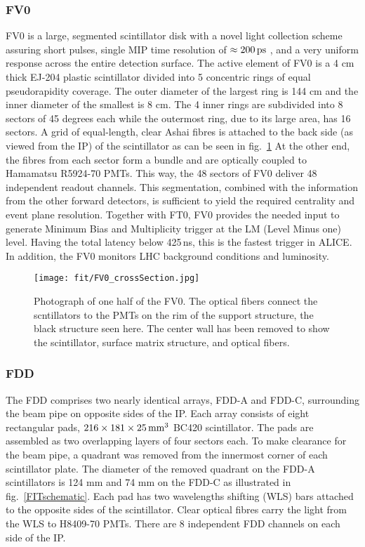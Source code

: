 \subsubsection{FV0}
FV0 is a large, segmented scintillator disk with a novel light collection scheme \cite{grabski2019new} assuring short pulses, single MIP time resolution of $\approx 200\, \rm{ps}$  , and a very uniform response across the entire detection surface. The active element of FV0 is a 4 cm thick EJ-204 plastic scintillator divided into 5 concentric rings of equal pseudorapidity coverage. The outer diameter of the largest ring is 144 cm and the inner diameter of the smallest is 8 cm. The 4 inner rings are subdivided into 8 sectors of 45 degrees each while the outermost ring, due to its large area, has 16 sectors. A grid of equal-length, clear Ashai fibres is attached to the back side (as viewed from the IP) of the scintillator as can be seen in fig.~\ref{FV0fig} At the other end, the fibres from each sector form a bundle and are optically coupled to Hamamatsu R5924-70 PMTs. This way, the 48 sectors of FV0 deliver 48 independent readout channels. This segmentation, combined with the information from the other forward detectors, is sufficient to yield the required centrality and event plane resolution. Together with FT0, FV0 provides the needed input to generate Minimum Bias and Multiplicity trigger at the LM (Level Minus one) level. Having the total latency below 425\,ns, this is the fastest trigger in ALICE. In addition, the FV0 monitors LHC background conditions and luminosity. 

\begin{figure}[htbp]
\begin{center}
\texttt{[image: fit/FV0\_crossSection.jpg]}
\caption{ Photograph of one half of the FV0. The optical fibers connect the scntillators to the PMTs on the rim of the support structure, the black structure seen here. The center wall has been removed to show the scintillator, surface matrix structure, and optical fibers.}
\label{FV0fig}
\end{center}
\end{figure}


\subsubsection{FDD}
The FDD \cite{Rojastorres} comprises  two nearly identical arrays, FDD-A and FDD-C, surrounding the beam pipe on opposite sides of the IP.  Each array consists of eight rectangular pads, $216 \times 181 \times 25\, \rm{mm}^3$ BC420 scintillator. The pads are assembled as  two overlapping layers of four sectors each. To make clearance for the beam pipe, a quadrant was removed from the innermost corner of each scintillator plate. The diameter of the removed quadrant on the FDD-A scintillators is 124 mm and 74 mm on the FDD-C as illustrated in fig.~\ref{FITschematic}. Each pad has two wavelengths shifting (WLS)
bars attached to the opposite sides of the scintillator. Clear optical fibres carry the light
from the WLS to H8409-70 PMTs. There are 8 independent FDD channels on each side of the IP.

